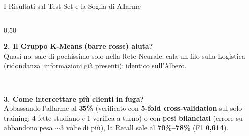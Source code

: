 \documentclass[aspectratio=169, 10pt]{beamer}
\newcommand{\card}[3]{%
    \colorbox{#1}{\parbox{\dimexpr#2-2\fboxsep\relax}{\raggedright #3}}%
}
\begin{document}
\begin{frame}{I Risultati sul Test Set e la Soglia di Allarme}
\begin{columns}[c, onlytextwidth]
\begin{column}{0.50\textwidth}
            \card{CardAmber}{\linewidth}{\scriptsize
                \textbf{\color{AccentAmber}\small 2. Il Gruppo K-Means (barre rosse) aiuta?}\\[1.5pt]
                Quasi no: sale di pochissimo solo nella Rete Neurale; cala un filo sulla Logistica (ridondanza: informazioni già presenti); identico sull'Albero.
            }\\[1.8mm]

            \card{CardRed}{\linewidth}{\scriptsize
                \textbf{\color{AccentRed}\small 3. Come intercettare più clienti in fuga?}\\[1.5pt]
                Abbassando l'allarme al \textbf{35\%} (verificato con \textbf{5-fold cross-validation} sul solo training: 4 fette studiano e 1 verifica a turno) o con \textbf{pesi bilanciati} (errore su abbandono pesa $\sim$3 volte di più), la Recall sale al \textbf{70\%--78\%} (F1 \textbf{0,614}).
            }
        \end{column}
    \end{columns}
\end{frame}
\end{document}
